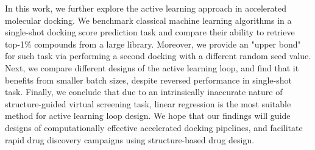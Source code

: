 In this work, we further explore the active learning approach in accelerated molecular docking. We benchmark classical machine learning algorithms in a single-shot docking score prediction task and compare their ability to retrieve top-1\% compounds from a large library. Moreover, we provide an "upper bond" for such task via performing a second docking with a different random seed value. Next, we compare different designs of the active learning loop, and find that it benefits from smaller batch sizes, despite reversed performance in single-shot task. Finally, we conclude that due to an intrinsically inaccurate nature of structure-guided virtual screening task, linear regression is the most suitable method for active learning loop design. We hope that our findings will guide designs of computationally effective accelerated docking pipelines, and facilitate rapid drug discovery campaigns using structure-based drug design.


 





